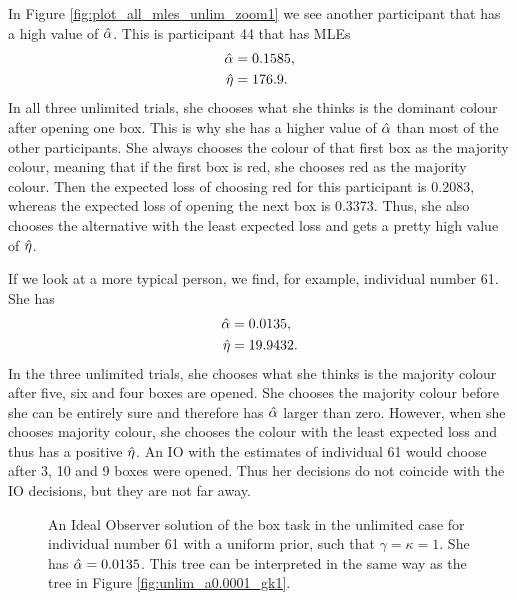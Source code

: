 In Figure \ref{fig:plot_all_mles_unlim_zoom1} we see another participant that has a high value of $\hat{\alpha}$. This is participant 44 that has MLEs
\begin{equation}
\label{mles_unlim_person44}
    \begin{aligned}
        \hat{\alpha} &= 0.1585,\\
        \hat{\eta} &= 176.9.
    \end{aligned}
\end{equation}
In all three unlimited trials, she chooses what she thinks is the dominant colour after opening one box. This is why she has a higher value of $\hat{\alpha}$ than most of the other participants. She always chooses the colour of that first box as the majority colour, meaning that if the first box is red, she chooses red as the majority colour. Then the expected loss of choosing red for this participant is 0.2083, whereas the expected loss of opening the next box is 0.3373. Thus, she also chooses the alternative with the least expected loss and gets a pretty high value of $\hat{\eta}$.


If we look at a more typical person, we find, for example, individual number 61. She has
\begin{equation}
\label{mles_unilim_person61}
    \begin{aligned}
        \hat{\alpha} &= 0.0135,\\
        \hat{\eta} &= 19.9432.
    \end{aligned}
\end{equation}
In the three unlimited trials, she chooses what she thinks is the majority colour after five, six and four boxes are opened. She chooses the majority colour before she can be entirely sure and therefore has $\hat{\alpha}$ larger than zero. However, when she chooses majority colour, she chooses the colour with the least expected loss and thus has a positive $\hat{\eta}$. An IO with the estimates of individual 61 would choose after 3, 10 and 9 boxes were opened. Thus her decisions do not coincide with the IO decisions, but they are not far away.  
\begin{figure}
    \centering
    \scalebox{0.7}{}
    \caption[Ideal Observer solution individual 61, unlimited. $\gamma=\kappa=1$]{An Ideal Observer solution of the box task in the unlimited case for individual number 61 with a uniform prior, such that $\gamma=\kappa=1$. She has $\hat{\alpha}=0.0135$. This tree can be interpreted in the same way as the tree in Figure \ref{fig:unlim_a0.0001_gk1}.}
    \label{fig:IO_sol_individual61}
\end{figure}

